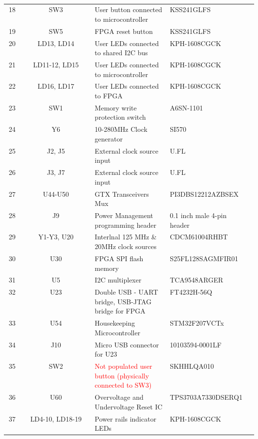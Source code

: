 \documentclass[12pt,oneside,a4]{article}
\begin{document}
\begin{table}[htbp]
\begin{tabular}{@{}ccp{0.3\linewidth}p{0.3\linewidth}c@{}}
18 & SW3 & User button connected to microcontroller      &  KSS241GLFS  &  \\
19 & SW5 & FPGA reset button   		 & KSS241GLFS      &  \\
20 & LD13, LD14 & User LEDs connected to shared I2C bus & KPH-1608CGCK &  \\
21 & LD11-12, LD15 & User LEDs connected to microcontroller &  KPH-1608CGCK  &  \\
22 & LD16, LD17    & User LEDs connected to FPGA &  KPH-1608CGCK     &  \\
23 & SW1 & Memory write protection switch  & A6SN-1101 &  \\
24 & Y6  & 10-280MHz Clock generator   & SI570  &  \\
25 & J2, J5    & External clock source input & U.FL      &  \\
26 & J3, J7 &  External clock source input &   U.FL       &  \\
27 & U44-U50    & GTX Transceivers Mux & PI3DBS12212AZBSEX  &  \\
28 & J9  & Power Management programming header & 0.1 inch male 4-pin header &  \\
29 & Y1-Y3, U20 & Interlnal 125 MHz \& 20MHz clock sources & CDCM61004RHBT &  \\
30 & U30 &  FPGA SPI flash memory  & S25FL128SAGMFIR01 &  \\
31 & U5  &  I2C multiplexer    & TCA9548ARGER   &  \\
32 & U23 &  Double USB - UART bridge, USB-JTAG bridge for FPGA & FT4232H-56Q   &  \\
33 & U54 & Housekeeping Microcontroller  & STM32F207VCTx  &  \\
34 & J10 & Micro USB connector for U23  & 10103594-0001LF  &  \\
35 & SW2 & \textcolor{red}{Not populated user button (physically connected to SW3)}  & SKHHLQA010  &  \\ 
36 & U60 & Overvoltage and Undervoltage Reset IC & TPS3703A7330DSERQ1 &  \\
37 & LD4-10, LD18-19 & Power rails indicator LEDs & KPH-1608CGCK &  \\ \bottomrule

\end{tabular}
\caption{}
\label{tab:my-table}
\end{table}
\hspace*{-1cm}
\end{document}
